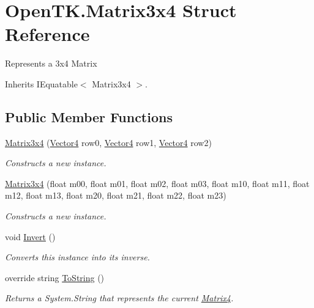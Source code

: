 \hypertarget{struct_open_t_k_1_1_matrix3x4}{\section{Open\-T\-K.\-Matrix3x4 Struct Reference}
\label{struct_open_t_k_1_1_matrix3x4}
}


Represents a 3x4 Matrix  




Inherits I\-Equatable$<$ Matrix3x4 $>$.

\subsection*{Public Member Functions}
\begin{DoxyCompactItemize}
\item 
\hyperlink{struct_open_t_k_1_1_matrix3x4_aae161e13c753173ab160695dae6f7488}{Matrix3x4} (\hyperlink{struct_open_t_k_1_1_vector4}{Vector4} row0, \hyperlink{struct_open_t_k_1_1_vector4}{Vector4} row1, \hyperlink{struct_open_t_k_1_1_vector4}{Vector4} row2)
\begin{DoxyCompactList}\small\item\em Constructs a new instance. \end{DoxyCompactList}\item 
\hyperlink{struct_open_t_k_1_1_matrix3x4_ab3d5499459fe1d8527581c50d1d9db5b}{Matrix3x4} (float m00, float m01, float m02, float m03, float m10, float m11, float m12, float m13, float m20, float m21, float m22, float m23)
\begin{DoxyCompactList}\small\item\em Constructs a new instance. \end{DoxyCompactList}\item 
void \hyperlink{struct_open_t_k_1_1_matrix3x4_aae874f4b5ac445389429e14db5619373}{Invert} ()
\begin{DoxyCompactList}\small\item\em Converts this instance into its inverse. \end{DoxyCompactList}\item 
override string \hyperlink{struct_open_t_k_1_1_matrix3x4_a52cee24b59689e3dc9f74fbb896f0a60}{To\-String} ()
\begin{DoxyCompactList}\small\item\em Returns a System.\-String that represents the current \hyperlink{struct_open_t_k_1_1_matrix4}{Matrix4}. \end{DoxyCompactList}\item 

\end{DoxyCompactItemize}
